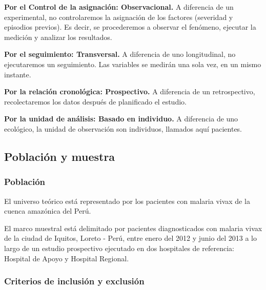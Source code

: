 \documentclass[]{article}
\begin{document}
\textbf{Por el Control de la asignación: Observacional.} A diferencia de
un experimental, no controlaremos la asignación de los factores
(severidad y episodios previos). Es decir, se procederemos a observar el
fenómeno, ejecutar la medición y analizar los resultados.

\textbf{Por el seguimiento: Transversal.} A diferencia de uno
longitudinal, no ejecutaremos un seguimiento. Las variables se medirán
una sola vez, en un mismo instante.

\textbf{Por la relación cronológica: Prospectivo.} A diferencia de un
retrospectivo, recolectaremos los datos después de planificado el
estudio.

\textbf{Por la unidad de análisis: Basado en individuo.} A diferencia de
uno ecológico, la unidad de observación son individuos, llamados aquí
pacientes.

\subsection{Población y muestra}\label{poblacion-y-muestra}

\subsubsection{Población}\label{poblacion}

El universo teórico está representado por los pacientes con malaria
vivax de la cuenca amazónica del Perú.

El marco muestral está delimitado por pacientes diagnosticados con
malaria vivax de la ciudad de Iquitos, Loreto - Perú, entre enero del
2012 y junio del 2013 a lo largo de un estudio prospectivo ejecutado en
dos hospitales de referencia: Hospital de Apoyo y Hospital Regional.

\subsubsection{Criterios de inclusión y
exclusión}\label{criterios-de-inclusion-y-exclusion}
\end{document}

